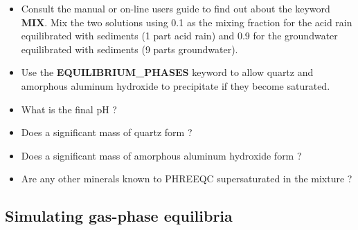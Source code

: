 \begin {itemize}
\item Consult the manual or on-line users guide to find out about the keyword {\color{red}\textbf{MIX}}.
Mix the two solutions using 0.1 as the mixing fraction for the acid rain equilibrated with sediments (1 part acid rain) and 0.9 for the groundwater equilibrated with sediments (9 parts groundwater).

\item Use the {\color{red}\textbf{EQUILIBRIUM\_PHASES}} keyword to allow quartz and 
amorphous aluminum hydroxide to precipitate if they become saturated.

\item What is the final pH ?

\item Does a significant mass of quartz form ?

\item Does a significant mass of amorphous aluminum hydroxide form ?

\item Are any other minerals known to PHREEQC supersaturated in the mixture ?
\end{itemize}


\subsection[Simulating gas-phase equilibria]{Simulating gas-phase equilibria}

